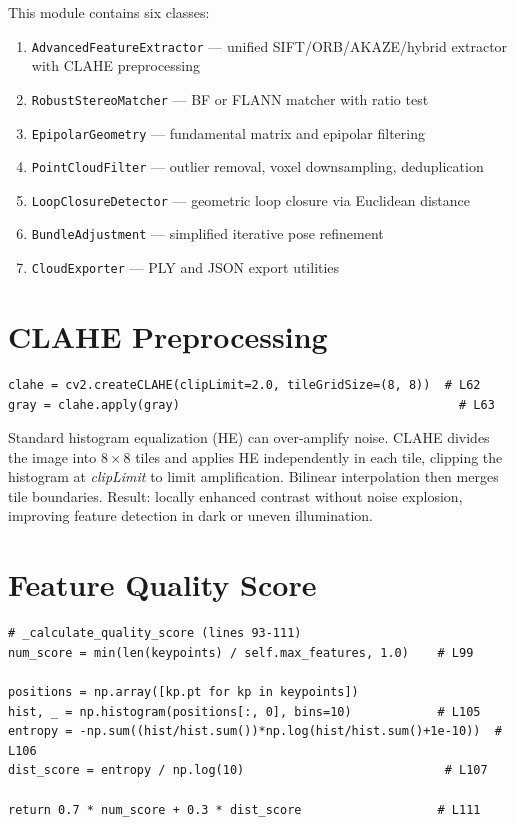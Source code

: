 \documentclass[12pt,a4paper,twoside]{report}
\theoremstyle{definition}
\newcommand{\code}[1]{\texttt{#1}}
\begin{document}
This module contains six classes:
\begin{enumerate}
  \item \code{AdvancedFeatureExtractor} --- unified SIFT/ORB/AKAZE/hybrid extractor with CLAHE preprocessing
  \item \code{RobustStereoMatcher} --- BF or FLANN matcher with ratio test
  \item \code{EpipolarGeometry} --- fundamental matrix and epipolar filtering
  \item \code{PointCloudFilter} --- outlier removal, voxel downsampling, deduplication
  \item \code{LoopClosureDetector} --- geometric loop closure via Euclidean distance
  \item \code{BundleAdjustment} --- simplified iterative pose refinement
  \item \code{CloudExporter} --- PLY and JSON export utilities
\end{enumerate}

\section{CLAHE Preprocessing}

\begin{lstlisting}
clahe = cv2.createCLAHE(clipLimit=2.0, tileGridSize=(8, 8))  # L62
gray = clahe.apply(gray)                                       # L63
\end{lstlisting}

\begin{defbox}
Standard histogram equalization (HE) can over-amplify noise. CLAHE divides
the image into $8\times8$ tiles and applies HE independently in each tile,
clipping the histogram at \emph{clipLimit} to limit amplification. Bilinear
interpolation then merges tile boundaries. Result: locally enhanced contrast
without noise explosion, improving feature detection in dark or uneven
illumination.
\end{defbox}

\section{Feature Quality Score}

\begin{lstlisting}
# _calculate_quality_score (lines 93-111)
num_score = min(len(keypoints) / self.max_features, 1.0)    # L99

positions = np.array([kp.pt for kp in keypoints])
hist, _ = np.histogram(positions[:, 0], bins=10)            # L105
entropy = -np.sum((hist/hist.sum())*np.log(hist/hist.sum()+1e-10))  # L106
dist_score = entropy / np.log(10)                            # L107

return 0.7 * num_score + 0.3 * dist_score                   # L111
\end{lstlisting}
\end{document}

